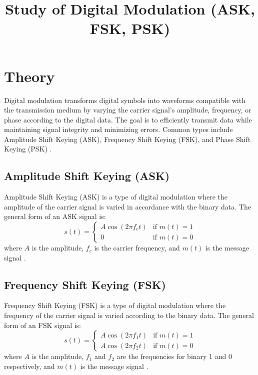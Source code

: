 \documentclass[12pt]{article}
\title{Study of Digital Modulation (ASK, FSK, PSK)}
\author{}
\date{}
\begin{document}


\pagebreak

\tableofcontents

\pagebreak
{}
\maketitle

\section*{Theory}
Digital modulation transforms digital symbols into waveforms compatible with the transmission medium by varying the carrier signal's amplitude, frequency, or phase according to the digital data. The goal is to efficiently transmit data while maintaining signal integrity and minimizing errors. Common types include Amplitude Shift Keying (ASK), Frequency Shift Keying (FSK), and Phase Shift Keying (PSK) \cite{proakis2007digital}.

\subsection*{Amplitude Shift Keying (ASK)}
Amplitude Shift Keying (ASK) is a type of digital modulation where the amplitude of the carrier signal is varied in accordance with the binary data. The general form of an ASK signal is:
\[
    s(t) =
    \begin{cases}
        A \cos(2 \pi f_c t) & \text{if } m(t) = 1 \\
        0                   & \text{if } m(t) = 0
    \end{cases}
\]
where \( A \) is the amplitude, \( f_c \) is the carrier frequency, and \( m(t) \) is the message signal \cite{sklar2001digital}.

\subsection*{Frequency Shift Keying (FSK)}
Frequency Shift Keying (FSK) is a type of digital modulation where the frequency of the carrier signal is varied according to the binary data. The general form of an FSK signal is:
\[
    s(t) =
    \begin{cases}
        A \cos(2 \pi f_1 t) & \text{if } m(t) = 1 \\
        A \cos(2 \pi f_2 t) & \text{if } m(t) = 0
    \end{cases}
\]
where \( A \) is the amplitude, \( f_1 \) and \( f_2 \) are the frequencies for binary 1 and 0 respectively, and \( m(t) \) is the message signal \cite{haykin2001communication}.
\end{document}
